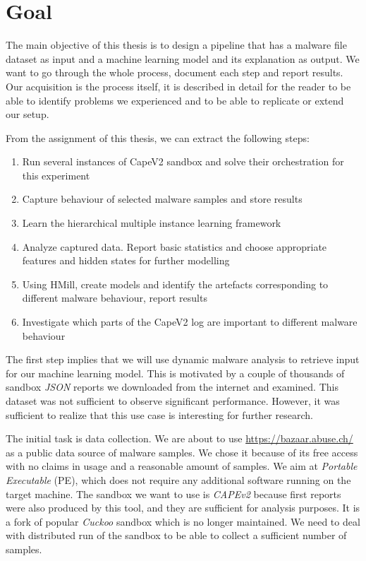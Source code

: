 \section*{Goal}
The main objective of this thesis is to design a pipeline that has a malware file dataset as input and a machine learning model and its explanation as output. We want to go through the whole process, document each step and report results. Our acquisition is the process itself, it is described in detail for the reader to be able to identify problems we experienced and to be able to replicate or extend our setup.

From the assignment of this thesis, we can extract the following steps:
\begin{enumerate}
    \itemsep0em 
    \item Run several instances of CapeV2 \cite{Cape} sandbox and solve their orchestration for this experiment
    \item Capture behaviour of selected malware samples and store results
    \item Learn the hierarchical multiple instance learning framework
    \item Analyze captured data. Report basic statistics and choose appropriate features and hidden states for further modelling
    \item Using HMill, create models and identify the artefacts corresponding to different malware behaviour, report results
    \item Investigate which parts of the CapeV2 log are important to different malware behaviour
\end{enumerate}

The first step implies that we will use dynamic malware analysis to retrieve input for our machine learning model. This is motivated by a couple of thousands of sandbox \emph{JSON} reports we downloaded from the internet and examined. This dataset was not sufficient to observe significant performance. However, it was sufficient to realize that this use case is interesting for further research.

The initial task is data collection. We are about to use \url{https://bazaar.abuse.ch/} as a public data source of malware samples. We chose it because of its free access with no claims in usage and a reasonable amount of samples. We aim at \emph{Portable Executable} (PE), which does not require any additional software running on the target machine. The sandbox we want to use is \emph{CAPEv2} \cite{Cape} because first reports were also produced by this tool, and they are sufficient for analysis purposes.  It is a fork of popular \emph{Cuckoo} sandbox which is no longer maintained. We need to deal with distributed run of the sandbox to be able to collect a sufficient number of samples.

